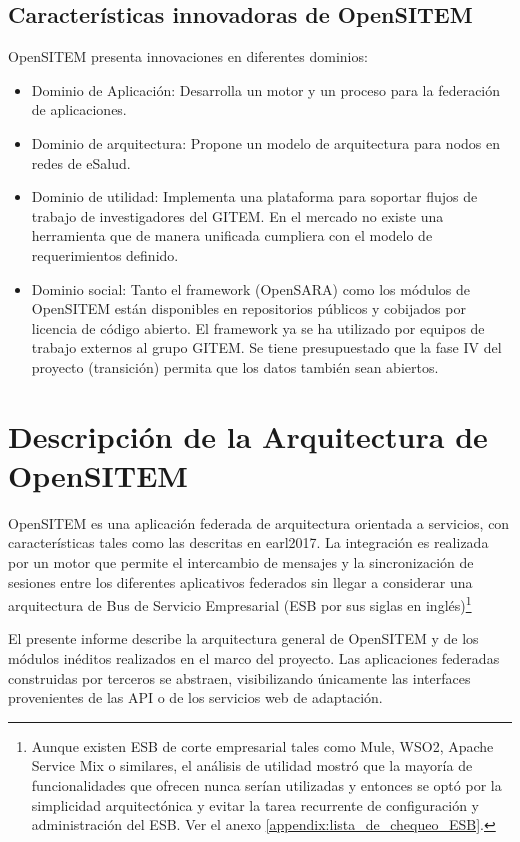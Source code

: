 \subsection{Características innovadoras de OpenSITEM}


OpenSITEM presenta innovaciones en diferentes dominios:

\begin{itemize}
 \item Dominio de Aplicación: Desarrolla un motor y un proceso para la federación de aplicaciones. 
 \item Dominio de arquitectura: Propone un modelo de arquitectura para nodos en redes de eSalud.
 \item Dominio de utilidad: Implementa una plataforma para soportar flujos de trabajo de investigadores del GITEM. En el mercado no existe una herramienta que de manera unificada cumpliera con el modelo de requerimientos definido.
 \item Dominio social: Tanto el framework (OpenSARA) como los módulos de OpenSITEM están disponibles en repositorios públicos y cobijados por licencia de código abierto. El framework ya se ha utilizado por equipos de trabajo externos al grupo GITEM. Se tiene presupuestado que la fase IV del proyecto (transición) permita que los datos también sean abiertos. 
\end{itemize}


\section{Descripción de la Arquitectura de OpenSITEM}

OpenSITEM es una aplicación federada de arquitectura orientada a servicios, con características tales como las descritas en {earl2017}. La integración es realizada por un motor que permite el intercambio de mensajes y la sincronización de sesiones entre los diferentes aplicativos federados sin llegar a considerar una arquitectura de Bus de Servicio Empresarial (ESB por sus siglas en inglés)\footnote{Aunque existen ESB de corte empresarial tales como Mule, WSO2, Apache Service Mix o similares, el análisis de utilidad mostró que la mayoría de funcionalidades que ofrecen nunca serían utilizadas y entonces se optó por la simplicidad arquitectónica y evitar la tarea recurrente de configuración y administración del ESB. Ver el anexo \ref{appendix:lista_de_chequeo_ESB}.} 

El presente informe describe la arquitectura general de OpenSITEM y de los módulos inéditos realizados en el marco del proyecto. Las aplicaciones federadas construidas por terceros se abstraen, visibilizando únicamente las interfaces provenientes de las API o de los servicios web de adaptación. 

